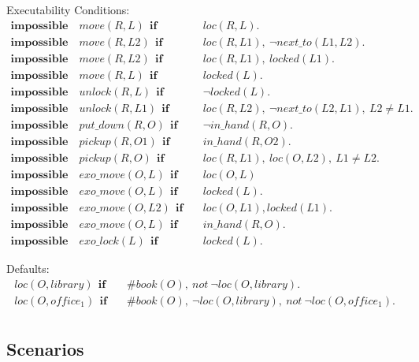 \documentclass[11pt, oneside]{article}
\begin{document}
Executability Conditions:
\begin{align*}
  \mathbf{impossible}\quad move(R, L)~~\mathbf{if}&\quad loc(R,L).\\
  \mathbf{impossible}\quad move(R, L2)~~\mathbf{if}&\quad loc(R,L1),~\neg next\_to(L1,L2).\\
  \mathbf{impossible}\quad move(R,L2)~~\mathbf{if}&\quad loc(R,L1),~locked(L1).\\
  \mathbf{impossible}\quad move(R,L)~~\mathbf{if}&\quad locked(L).\\
  \mathbf{impossible}\quad unlock(R, L)~~\mathbf{if}&\quad \neg locked(L).\\
  \mathbf{impossible}\quad unlock(R, L1)~~\mathbf{if}&\quad loc(R,L2),~\neg next\_to(L2,L1),~L2\neq L1.\\
  \mathbf{impossible}\quad put\_down(R,O)~~\mathbf{if}&\quad \neg in\_hand(R,O).\\
  \mathbf{impossible}\quad pickup(R,O1)~~\mathbf{if}&\quad in\_hand(R,O2).\\
  \mathbf{impossible}\quad pickup(R,O)~~\mathbf{if}&\quad loc(R,L1),~loc(O,L2),~L1 \neq L2.\\
  \mathbf{impossible}\quad exo\_move(O,L)~~\mathbf{if}&\quad loc(O,L)\\
  \mathbf{impossible}\quad exo\_move(O,L)~~\mathbf{if}&\quad locked(L).\\
  \mathbf{impossible}\quad exo\_move(O,L2)~~\mathbf{if}&\quad loc(O,L1), locked(L1).\\
  \mathbf{impossible}\quad exo\_move(O,L)~~\mathbf{if}&\quad in\_hand(R,O).\\
  \mathbf{impossible}\quad exo\_lock(L)~~\mathbf{if}&\quad locked(L).
\end{align*}

Defaults:
\begin{align*}
  loc(O, library)~~\mathbf{if}&\quad \#book(O),~not~\neg loc(O, library).\\
  loc(O, office_1)~~\mathbf{if}&\quad \#book(O),~\neg loc(O, library),~not~\neg loc(O, office_1).\\
\end{align*}
	 			  				 			  	 			             


\subsection{Scenarios}
\end{document}
